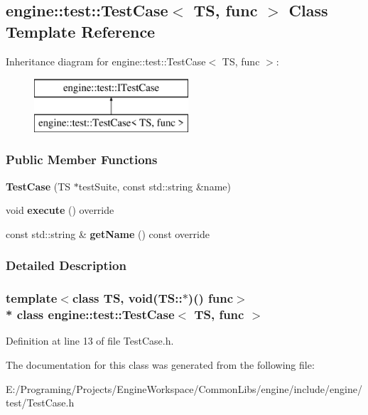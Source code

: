 \hypertarget{a00075}{}\subsection{engine\+:\+:test\+:\+:Test\+Case$<$ TS, func $>$ Class Template Reference}
\label{a00075}
Inheritance diagram for engine\+:\+:test\+:\+:Test\+Case$<$ TS, func $>$\+:\begin{figure}[H]
\begin{center}
\leavevmode
\includegraphics[height=2.000000cm]{a00075}
\end{center}
\end{figure}
\subsubsection*{Public Member Functions}
\begin{DoxyCompactItemize}
\item 
{\bfseries Test\+Case} (TS $\ast$test\+Suite, const std\+::string \&name)\hypertarget{a00075_a0a575a70c45c2096fcd1841e9755d025}{}\label{a00075_a0a575a70c45c2096fcd1841e9755d025}

\item 
void {\bfseries execute} () override\hypertarget{a00075_a2c6d3dc87bef42f18ea52eddb9546566}{}\label{a00075_a2c6d3dc87bef42f18ea52eddb9546566}

\item 
const std\+::string \& {\bfseries get\+Name} () const  override\hypertarget{a00075_a56151c7a0d3e5b1103654cac3dd2b6d0}{}\label{a00075_a56151c7a0d3e5b1103654cac3dd2b6d0}

\end{DoxyCompactItemize}


\subsubsection{Detailed Description}
\subsubsection*{template$<$class TS, void(\+T\+S\+::$\ast$)() func$>$\\*
class engine\+::test\+::\+Test\+Case$<$ T\+S, func $>$}



Definition at line 13 of file Test\+Case.\+h.



The documentation for this class was generated from the following file\+:\begin{DoxyCompactItemize}
\item 
E\+:/\+Programing/\+Projects/\+Engine\+Workspace/\+Common\+Libs/engine/include/engine/test/Test\+Case.\+h\end{DoxyCompactItemize}
